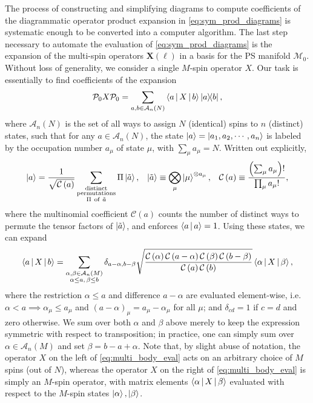 \documentclass[nofootinbib,notitlepage,11pt]{revtex4-2}
\renewcommand{\t}{\text} %
\newcommand{\f}[2]{\dfrac{#1}{#2}} %
\newcommand{\p}[1]{\left(#1\right)} %
\newcommand{\bk}{\Braket} %
\newcommand{\m}{\bm} %
\newcommand{\1}{\mathds{1}}
\newcommand{\A}{\mathcal{A}}
\newcommand{\C}{\mathcal{C}}
\newcommand{\M}{\mathcal{M}}
\renewcommand{\P}{\mathcal{P}}
\begin{document}
The process of constructing and simplifying diagrams to compute
coefficients of the diagrammatic operator product expansion in
\eqref{eq:sym_prod_diagrams} is systematic enough to be converted into
a computer algorithm.  The last step necessary to automate the
evaluation of \eqref{eq:sym_prod_diagrams} is the expansion of the
multi-spin operators $\m X\p{\ell}$ in a basis for the PS manifold
$\M_0$.  Without loss of generality, we consider a single $M$-spin
operator $X$.  Our task is essentially to find coefficients of the
expansion
\begin{align}
  \P_0 X \P_0
  = \sum_{a,b\in\A_n\p{N}} \bk{a|X|b} \op{a}{b},
\end{align}
where $\A_n\p{N}$ is the set of all ways to assign $N$ (identical)
spins to $n$ (distinct) states, such that for any $a\in\A_n\p{N}$, the
state $\ket{a}=\ket{a_1,a_2,\cdots,a_n}$ is labeled by the occupation
number $a_\mu$ of state $\mu$, with $\sum_\mu a_\mu = N$.  Written out
explicitly,
\begin{align}
  \ket{a} = \f1{\sqrt{\C\p{a}}}
  \sum_{\substack{\t{distinct}\\\t{permutations}\\\Pi~\t{of}~\tilde a}}
  \Pi \ket{\tilde a},
  &&
  \ket{\tilde a} \equiv \bigotimes_\mu \ket{\mu}^{\otimes a_\mu},
  &&
  \C\p{a} \equiv \f{\p{\sum_\mu a_\mu}!}{\prod_\mu a_\mu!},
\end{align}
where the multinomial coefficient $\C\p{a}$ counts the number of
distinct ways to permute the tensor factors of $\ket{\tilde a}$, and
enforces $\bk{a|a}=1$.  Using these states, we can expand
\begin{align}
  \bk{a|X|b}
  = \sum_{\substack{\alpha,\beta\in\A_n\p{M}\\\alpha\le a,\,\beta\le b}}
  \delta_{a-\alpha,b-\beta}
  \sqrt{\f{\C\p{\alpha}\C\p{a-\alpha}\C\p{\beta}\C\p{b-\beta}}
    {\C\p{a}\C\p{b}}}
  \bk{\alpha|X|\beta},
  \label{eq:multi_body_eval}
\end{align}
where the restriction $\alpha\le a$ and difference $a-\alpha$ are
evaluated element-wise, i.e.~$\alpha<a\implies \alpha_\mu\le a_\mu$
and $\p{a-\alpha}_\mu=a_\mu-\alpha_\mu$ for all $\mu$; and
$\delta_{cd}=1$ if $c=d$ and zero otherwise.  We sum over both
$\alpha$ and $\beta$ above merely to keep the expression symmetric
with respect to transposition; in practice, one can simply sum over
$\alpha\in\A_n\p{M}$ and set $\beta=b-a+\alpha$.  Note that, by slight
abuse of notation, the operator $X$ on the left of
\eqref{eq:multi_body_eval} acts on an arbitrary choice of $M$ spins
(out of $N$), whereas the operator $X$ on the right of
\eqref{eq:multi_body_eval} is simply an $M$-spin operator, with matrix
elements $\bk{\alpha|X|\beta}$ evaluated with respect to the $M$-spin
states $\ket\alpha,\ket\beta$.
\end{document}

